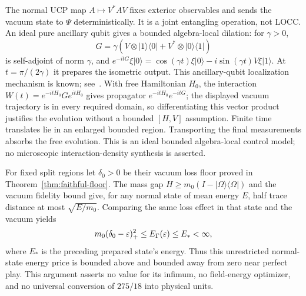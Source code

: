 The normal UCP map $A\mapsto V^*AV$ fixes exterior observables and sends the vacuum state to $\Psi$ deterministically. It is a joint entangling operation, not LOCC. An ideal pure ancillary qubit gives a bounded algebra-local dilation: for $\gamma>0$,
\[
 G=\gamma(V\otimes|1\rangle\langle0|+V^*\otimes|0\rangle\langle1|)
\]
is self-adjoint of norm $\gamma$, and $e^{-itG}\xi|0\rangle=\cos(\gamma t)\xi|0\rangle-i\sin(\gamma t)V\xi|1\rangle$. At $t=\pi/(2\gamma)$ it prepares the isometric output. This ancillary-qubit localization mechanism is known; see~\cite[Section V.2]{GullaSkaar}. With free Hamiltonian $H_0$, the interaction $W(t)=e^{-itH_0}Ge^{itH_0}$ gives propagator $e^{-itH_0}e^{-itG}$; the displayed vacuum trajectory is in every required domain, so differentiating this vector product justifies the evolution without a bounded $[H,V]$ assumption. Finite time translates lie in an enlarged bounded region. Transporting the final measurements absorbs the free evolution. This is an ideal bounded algebra-local control model; no microscopic interaction-density synthesis is asserted.

For fixed split regions let $\delta_0>0$ be their vacuum loss floor proved in Theorem~\ref{thm:faithful-floor}. The mass gap $H\ge m_0(I-|\Omega\rangle\langle\Omega|)$ and the vacuum fidelity bound give, for any normal state of mean energy $E$, half trace distance at most $\sqrt{E/m_0}$. Comparing the same loss effect in that state and the vacuum yields
\[
 m_0(\delta_0-\varepsilon)_+^2\le E_\Gamma(\varepsilon)\le E_*<\infty,
\]
where $E_*$ is the preceding prepared state's energy. Thus this unrestricted normal-state energy price is bounded above and bounded away from zero near perfect play. This argument asserts no value for its infimum, no field-energy optimizer, and no universal conversion of $275/18$ into physical units.
